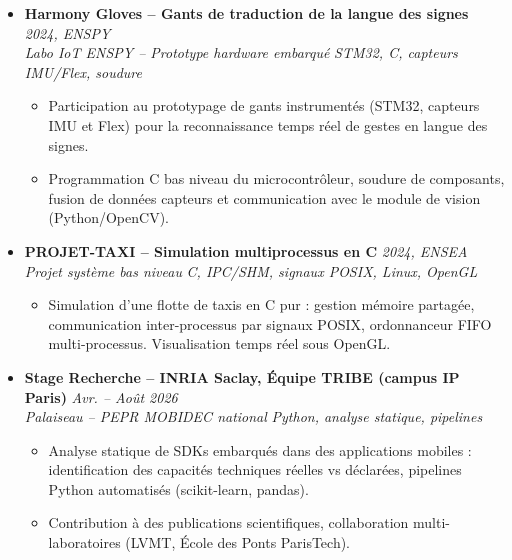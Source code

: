 \documentclass[a4paper,11pt]{article}
\begin{document}
\begin{itemize}[leftmargin=*, label={-}]
\item \textbf{Harmony Gloves -- Gants de traduction de la langue des signes} \hfill \textit{2024, ENSPY} \\
\textit{Labo IoT ENSPY -- Prototype hardware embarqué} \hfill \textit{STM32, C, capteurs IMU/Flex, soudure}
\vspace{-2pt}
\begin{itemize}[leftmargin=0.4cm, nosep, label=\tiny$\bullet$]
    \item \small{Participation au prototypage de gants instrumentés (STM32, capteurs IMU et Flex) pour la reconnaissance temps réel de gestes en langue des signes.}
    \item \small{Programmation C bas niveau du microcontrôleur, soudure de composants, fusion de données capteurs et communication avec le module de vision (Python/OpenCV).}
\end{itemize}
\vspace{3pt}

\item \textbf{PROJET-TAXI -- Simulation multiprocessus en C} \hfill \textit{2024, ENSEA} \\
\textit{Projet système bas niveau} \hfill \textit{C, IPC/SHM, signaux POSIX, Linux, OpenGL}
\vspace{-2pt}
\begin{itemize}[leftmargin=0.4cm, nosep, label=\tiny$\bullet$]
    \item \small{Simulation d'une flotte de taxis en C pur : gestion mémoire partagée, communication inter-processus par signaux POSIX, ordonnanceur FIFO multi-processus. Visualisation temps réel sous OpenGL.}
\end{itemize}
\vspace{3pt}

\item \textbf{Stage Recherche -- INRIA Saclay, Équipe TRIBE (campus IP Paris)} \hfill \textit{Avr. -- Août 2026} \\
\textit{Palaiseau -- PEPR MOBIDEC national} \hfill \textit{Python, analyse statique, pipelines}
\vspace{-2pt}
\begin{itemize}[leftmargin=0.4cm, nosep, label=\tiny$\bullet$]
    \item \small{Analyse statique de SDKs embarqués dans des applications mobiles : identification des capacités techniques réelles vs déclarées, pipelines Python automatisés (scikit-learn, pandas).}
    \item \small{Contribution à des publications scientifiques, collaboration multi-laboratoires (LVMT, École des Ponts ParisTech).}
\end{itemize}
\vspace{3pt}

\end{itemize}
\end{document}
